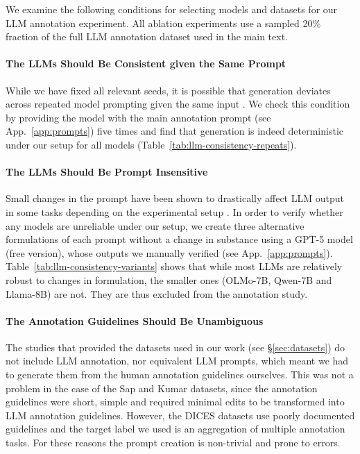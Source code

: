 \documentclass[manuscript,screen,review,anonymous]{acmart}
\theoremstyle{acmplain}
\theoremstyle{researchquestionstyle}
\begin{document}
We examine the following conditions for selecting models and datasets for our LLM annotation experiment. All ablation experiments use a sampled 20\% fraction of the full LLM annotation dataset used in the main text.

\paragraph{The LLMs Should Be Consistent given the Same Prompt} While we have fixed all relevant seeds, it is possible that generation deviates across repeated model prompting given the same input \citep{bisbee_2023}. We check this condition by providing the model with the main annotation prompt (see App.~\ref{app:prompts}) five times and find that generation is indeed deterministic under our setup for all models (Table~\ref{tab:llm-consistency-repeats}).

\paragraph{The LLMs Should Be Prompt Insensitive} Small changes in the prompt have been shown to drastically affect LLM output in some tasks depending on the experimental setup \citep{razavi_sensitivity}. In order to verify whether any models are unreliable under our setup, we create three alternative formulations of each prompt without a change in substance using a GPT-5 model (free version), whose outputs we manually verified (see App.~\ref{app:prompts}). Table~\ref{tab:llm-consistency-variants} shows that while most LLMs are relatively robust to changes in formulation, the smaller ones (OLMo-7B, Qwen-7B and Llama-8B) are not. They are thus excluded from the annotation study.

\paragraph{The Annotation Guidelines Should Be Unambiguous} The studies that provided the datasets used in our work (see \S\ref{sec:datasets}) do not include LLM annotation, nor equivalent LLM prompts, which meant we had to generate them from the human annotation guidelines ourselves. This was not a problem in the case of the Sap and Kumar datasets, since the annotation guidelines were short, simple and required minimal edits to be transformed into LLM annotation guidelines. However, the DICES datasets use poorly documented guidelines and the target label we used is an aggregation of multiple annotation tasks. For these reasons the prompt creation is non-trivial and prone to errors.
\end{document}
